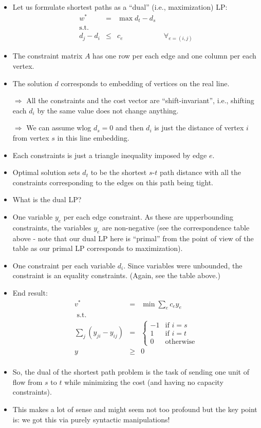 \documentclass{article}
\begin{document}
\begin{itemize}
\item Let us formulate shortest paths as a ``dual'' (i.e., maximization) LP:
\begin{eqnarray*}
w^*&=&\max d_t-d_s\\
\text{s.t.} && \\
d_j-d_i &\le &c_{e} \quad \quad\quad\quad\quad \text{  $\forall_{e=(i,j)}$}
\end{eqnarray*}
\item The constraint matrix $A$ has one row per each edge and one column per each vertex. 
\item The solution $d$ corresponds to embedding of vertices on the real line. 

$\Rightarrow$ All the constraints and the cost vector are ``shift-invariant'', i.e., shifting each $d_i$ by the same value does not change anything.

$\Rightarrow$ We can assume wlog $d_s=0$ and then $d_i$ is just the distance of vertex $i$ from vertex $s$ in this line embedding. 

\item Each constraints is just a triangle inequality imposed by edge $e$. 

\item Optimal solution sets $d_t$ to be the shortest $s$-$t$ path distance with all the constraints corresponding to the edges on this path being tight.

\item What is the dual LP? 

\item One variable $y_e$ per each edge constraint. As these are upperbounding constraints, the variables $y_e$ are non-negative (see the correspondence table above - note that our dual LP here is ``primal'' from the point of view of the table as our primal LP corresponds to maximization).
\item One constraint per each variable $d_i$.  Since variables were unbounded, the constraint is an equality constraints. (Again, see the table above.)
\item End result:
\begin{eqnarray*}
v^*&=&\min \sum_e c_e y_e\\
\text{ s.t.} & &\\
\sum_{j} \left(y_{ji}-y_{ij}\right) & = & 
{\begin{cases} -1 & \text{if $i=s$}\\
1 & \text{if $i=t$}\\
0 & \text{otherwise}
\end{cases}}\\
y &\ge &0\\
\end{eqnarray*}
\item So, the dual of the shortest path problem is the task of sending one unit of flow from $s$ to $t$ while minimizing the cost (and having no capacity constraints).
\item This makes a lot of sense and might seem not too profound but the key point is: we got this via purely syntactic manipulations!
\end{itemize}
\end{document}
